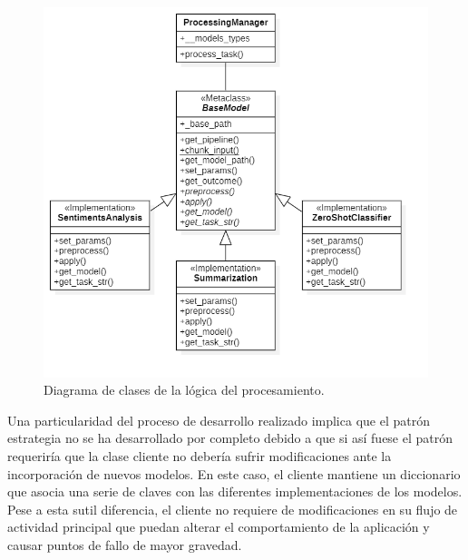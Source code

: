 \begin{figure}[!ht]
	\centering
\includegraphics[width=\textwidth]{img/class_diagram_processing.png}
	\caption{Diagrama de clases de la lógica del procesamiento.}
	\label{fig:class_diagram_processing}
\end{figure}

Una particularidad del proceso de desarrollo realizado implica que el patrón estrategia no se ha desarrollado por completo debido a que si así fuese el patrón requeriría que la clase cliente no debería sufrir modificaciones ante la incorporación de nuevos modelos. En este caso, el cliente mantiene un diccionario que asocia una serie de claves con las diferentes implementaciones de los modelos. Pese a esta sutil diferencia, el cliente no requiere de modificaciones en su flujo de actividad principal que puedan alterar el comportamiento de la aplicación y causar puntos de fallo de mayor gravedad.
